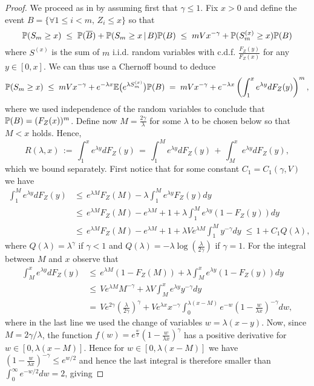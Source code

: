 \begin{proof}
We proceed as in \cite{Omelchenko2019} by assuming first that $\gamma\leq 1$. Fix $x>0$ and define the event $B=\{\forall 1\leq i< m,\,Z_i\leq x\}$ so that 
\[
    \mathbb{P}(S_m\geq x)\;\leq\;\mathbb{P}(\overline{B})+\mathbb{P}(S_m\geq x\,|\,B)\mathbb{P}(B)\;\leq\;mVx^{-\gamma}+\mathbb{P}(S^{(x)}_m\geq x)\mathbb{P}(B)
\]
where $S^{(x)}$ is the sum of $m$ i.i.d. random variables with c.d.f. $\frac{F_Z(y)}{F_Z(x)}$ for any $y \in [0,x]$. We can thus use a Chernoff bound to deduce
\[
    \mathbb{P}(S_m\geq x)\;\leq\;mVx^{-\gamma}+e^{-\lambda x}\mathbb{E}\big(e^{\lambda S^{(x)}_m}\big)\mathbb{P}(B)\;=\;mVx^{-\gamma}+e^{-\lambda x}\left(\int_1^xe^{\lambda y}dF_Z(y)\right)^m,
\]
where we used independence of the random variables to conclude that $\mathbb{P}(B)=(F_Z(x))^m$. Define now $M=\frac{2\gamma}{\lambda}$ for some $\lambda$ to be chosen below so that $M<x$ holds. Hence,
\[R(\lambda,x)\,:=\,\int_1^xe^{\lambda y}dF_Z(y)\,=\,\int_1^Me^{\lambda y}dF_Z(y)\,+\,\int_M^xe^{\lambda y}dF_Z(y),\]
which we bound separately. First notice that for some constant $C_1=C_1(\gamma, V)$ we have
\begin{align*}
    \int_1^Me^{\lambda y}dF_Z(y)&\leq\,e^{\lambda M}F_Z(M)-\lambda\int_1^Me^{\lambda y}F_Z(y)dy\\[3pt]
    &\leq\,e^{\lambda M}F_Z(M)-e^{\lambda M}+1+\lambda\int_1^Me^{\lambda y}(1-F_Z(y))dy\\[3pt]
    &\leq\,e^{\lambda M}F_Z(M)-e^{\lambda M}+1+\lambda Ve^{\lambda M}\int_1^My^{-\gamma}dy\;\leq\,1+C_1Q(\lambda),
\end{align*}
where $Q(\lambda)=\lambda^{\gamma}$ if $\gamma<1$ and $Q(\lambda)=-\lambda\log(\frac{\lambda}{2\gamma})$ if $\gamma=1$. For the integral between $M$ and $x$ observe that
\begin{align*}
    \int_M^xe^{\lambda y}dF_Z(y)&\leq\,e^{\lambda M}(1-F_Z(M))+\lambda\int_M^xe^{\lambda y}(1-F_Z(y))dy\\[3pt]
    &\leq\,Ve^{\lambda M}M^{-\gamma}+\lambda V\int_M^xe^{\lambda y}y^{-\gamma}dy\\[3pt]
    &=\,Ve^{2\gamma}\left(\frac{\lambda}{2\gamma}\right)^{\gamma}+ Ve^{\lambda x}x^{-\gamma}\int_0^{\lambda(x-M)}e^{-w}\left(1-\frac{w}{\lambda x}\right)^{-\gamma}dw,
\end{align*}
where in the last line we used the change of variables $w=\lambda(x-y)$. Now, since $M = 2\gamma/\lambda$, the function $f(w)=e^{\frac{w}{2}}(1-\frac{w}{\lambda x})^{\gamma}$ has a positive derivative for $w \in [0, \lambda(x-M)]$. Hence for $w\in[0,\lambda(x-M)]$ we have  $(1-\frac{w}{\lambda x})^{-\gamma}\leq e^{w/2}$  and hence the last integral is therefore smaller than $\int_0^\infty e^{-w/2}dw=2$, giving

\end{proof}
